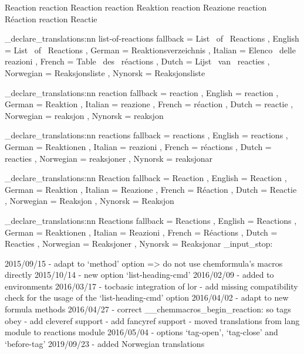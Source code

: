  {Reaction}
   {reaction} {Reaction}
    {reaction} {Reaktion}
   {reaction} {Reazione}
    {reaction} {R\'{e}action}
     {reaction} {Reactie}
\EndChemCompatibility

\chemmacros_declare_translations:nn {list-of-reactions}
  {
    fallback  = List~ of~ Reactions ,
    English   = List~ of~ Reactions ,
    German    = Reaktionsverzeichnis ,
    Italian   = Elenco~ delle~ reazioni ,
    French    = Table~ des~ r\'{e}actions ,
    Dutch     = Lijst~ van~ reacties ,
    Norwegian = Reaksjonsliste ,
    Nynorsk   = Reaksjonsliste
  }

\chemmacros_declare_translations:nn {reaction}
  {
    fallback  = reaction ,
    English   = reaction ,
    German    = Reaktion ,
    Italian   = reazione ,
    French    = r\'{e}action ,
    Dutch     = reactie ,
    Norwegian = reaksjon ,
    Nynorsk   = reaksjon
  }

\chemmacros_declare_translations:nn {reactions}
  {
    fallback  = reactions ,
    English   = reactions ,
    German    = Reaktionen ,
    Italian   = reazioni ,
    French    = r\'{e}actions ,
    Dutch     = reacties ,
    Norwegian = reaksjoner ,
	Nynorsk   = reaksjonar
  }

\chemmacros_declare_translations:nn {Reaction}
  {
    fallback  = Reaction ,
    English   = Reaction ,
    German    = Reaktion ,
    Italian   = Reazione ,
    French    = R\'{e}action ,
    Dutch     = Reactie ,
    Norwegian = Reaksjon ,
    Nynorsk   = Reaksjon
  }

\chemmacros_declare_translations:nn {Reactions}
  {
    fallback = Reactions ,
    English  = Reactions ,
    German   = Reaktionen ,
    Italian  = Reazioni ,
    French   = R\'{e}actions ,
    Dutch    = Reacties ,
    Norwegian = Reaksjoner ,
    Nynorsk   = Reaksjonar
 }
\EndChemCompatibility
\file_input_stop:

2015/09/15 - adapt to `method' option => do not use chemformula's macros
             directly
2015/10/14 - new option `list-heading-cmd'
2016/02/09 - added \ignorespacesafterend to environments
2016/03/17 - tocbasic integration of lor
           - add missing compatibility check for the usage of the
             `list-heading-cmd' option
2016/04/02 - adapt to new formula methods
2016/04/27 - correct \__chemmacros_begin_reaction: so tags obey \thereaction
           - add cleveref support
           - add fancyref support
           - moved translations from lang module to reactions module
2016/05/04 - options `tag-open', `tag-close' and `before-tag'
2019/09/23 - added Norwegian translations

